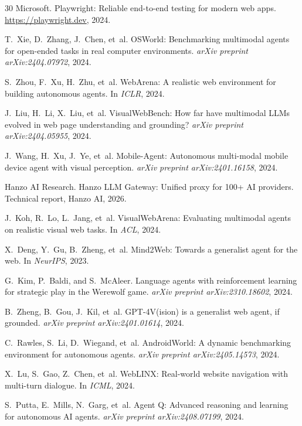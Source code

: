 \begin{thebibliography}{30}
Microsoft.
\newblock Playwright: Reliable end-to-end testing for modern web apps.
\newblock \url{https://playwright.dev}, 2024.

T.~Xie, D.~Zhang, J.~Chen, et~al.
\newblock OSWorld: Benchmarking multimodal agents for open-ended tasks in real computer environments.
\newblock \emph{arXiv preprint arXiv:2404.07972}, 2024.

S.~Zhou, F.~Xu, H.~Zhu, et~al.
\newblock WebArena: A realistic web environment for building autonomous agents.
\newblock In \emph{ICLR}, 2024.

J.~Liu, H.~Li, X.~Liu, et~al.
\newblock VisualWebBench: How far have multimodal LLMs evolved in web page understanding and grounding?
\newblock \emph{arXiv preprint arXiv:2404.05955}, 2024.

J.~Wang, H.~Xu, J.~Ye, et~al.
\newblock Mobile-Agent: Autonomous multi-modal mobile device agent with visual perception.
\newblock \emph{arXiv preprint arXiv:2401.16158}, 2024.

Hanzo AI Research.
\newblock Hanzo LLM Gateway: Unified proxy for 100+ AI providers.
\newblock Technical report, Hanzo AI, 2026.

J.~Koh, R.~Lo, L.~Jang, et~al.
\newblock VisualWebArena: Evaluating multimodal agents on realistic visual web tasks.
\newblock In \emph{ACL}, 2024.

X.~Deng, Y.~Gu, B.~Zheng, et~al.
\newblock Mind2Web: Towards a generalist agent for the web.
\newblock In \emph{NeurIPS}, 2023.

G.~Kim, P.~Baldi, and S.~McAleer.
\newblock Language agents with reinforcement learning for strategic play in the Werewolf game.
\newblock \emph{arXiv preprint arXiv:2310.18602}, 2024.

B.~Zheng, B.~Gou, J.~Kil, et~al.
\newblock GPT-4V(ision) is a generalist web agent, if grounded.
\newblock \emph{arXiv preprint arXiv:2401.01614}, 2024.

C.~Rawles, S.~Li, D.~Wiegand, et~al.
\newblock AndroidWorld: A dynamic benchmarking environment for autonomous agents.
\newblock \emph{arXiv preprint arXiv:2405.14573}, 2024.

X.~Lu, S.~Gao, Z.~Chen, et~al.
\newblock WebLINX: Real-world website navigation with multi-turn dialogue.
\newblock In \emph{ICML}, 2024.

S.~Putta, E.~Mills, N.~Garg, et~al.
\newblock Agent Q: Advanced reasoning and learning for autonomous AI agents.
\newblock \emph{arXiv preprint arXiv:2408.07199}, 2024.

\end{thebibliography}

